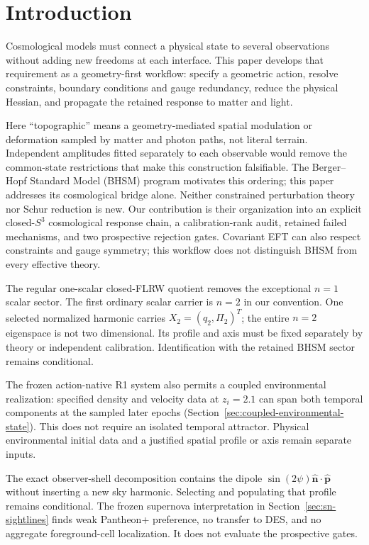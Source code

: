 \section{Introduction}
Cosmological models must connect a physical state to several observations
without adding new freedoms at each interface. This paper develops that
requirement as a geometry-first workflow: specify a geometric action,
resolve constraints, boundary conditions and gauge redundancy, reduce the
physical Hessian, and propagate the retained response to matter and light.

Here ``topographic'' means a geometry-mediated spatial modulation or
deformation sampled by matter and photon paths, not literal terrain.
Independent amplitudes fitted separately to each observable would remove
the common-state restrictions that make this construction falsifiable.
The Berger--Hopf Standard Model (BHSM) program motivates this ordering;
this paper addresses its cosmological bridge alone.
Neither constrained perturbation theory nor Schur reduction is new.
Our contribution is their organization into an explicit closed-$S^3$
cosmological response chain, a calibration-rank audit, retained failed
mechanisms, and two prospective rejection gates. Covariant EFT can also
respect constraints and gauge symmetry; this workflow does not distinguish
BHSM from every effective theory.

The regular one-scalar closed-FLRW quotient removes the exceptional $n=1$
scalar sector. The first ordinary scalar carrier is $n=2$ in our convention.
One selected normalized harmonic carries $X_2=(q_2,\Pi_2)^T$; the entire
$n=2$ eigenspace is not two dimensional. Its profile and axis must be fixed
separately by theory or independent calibration. Identification with the
retained BHSM sector remains conditional.

The frozen action-native R1 system also permits a coupled environmental
realization: specified density and velocity data at $z_i=2.1$ can span both
temporal components at the sampled later epochs
(Section~\ref{sec:coupled-environmental-state}). This does not require an
isolated temporal attractor. Physical environmental initial data and a
justified spatial profile or axis remain separate inputs.

The exact observer-shell decomposition contains the dipole
$\sin(2\psi)\hat{\mathbf n}\cdot\hat{\mathbf p}$ without inserting a new
sky harmonic. Selecting and populating that profile remains conditional.
The frozen supernova interpretation in Section~\ref{sec:sn-sightlines}
finds weak Pantheon+ preference, no transfer to DES, and no aggregate
foreground-cell localization. It does not evaluate the prospective gates.

